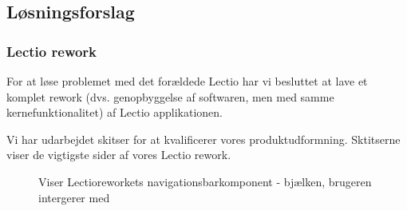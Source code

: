     \subsection{Løsningsforslag}
        \subsubsection{Lectio rework}
        For at løse problemet med det forældede Lectio har vi besluttet at lave et komplet rework (dvs. genopbyggelse af softwaren, men med samme kernefunktionalitet) af Lectio applikationen.

        Vi har udarbejdet skitser for at kvalificerer vores produktudformning. Sktitserne viser de vigtigste sider af vores Lectio rework.
        \begin{figure}[H]
            \centering
            \caption{Viser Lectioreworkets navigationsbarkomponent - bjælken, brugeren intergerer med}
        \end{figure}

